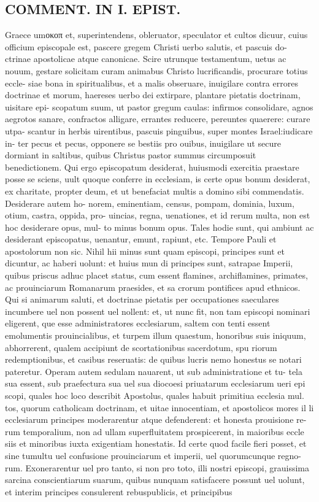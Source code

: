 \documentclass{article}
\begin{document}
\begin{pages}
\section*{COMMENT. IN I. EPIST. }
\marginpar{[ p.490 ]}\pstart Graece umοκοπ et, superintendens, obleruator, speculator et cultos dicuur, cuius officium episcopale est, pascere gregem Christi uerbo salutis, et pascuis do- ctrinae apostolicae atque canonicae. Scire utrunque testamentum, uetus ac nouum, gestare solicitam curam animabus Christo lucrificandis, procurare totius eccle- siae bona in spiritualibus, et a malis obseruare, inuigilare contra errores doctrinae et morum, haereses uerbo dei extirpare, plantare pietatis doctrinam, uisitare epi- scopatum suum, ut pastor gregum caulas: infirmos consolidare, agnos aegrotos sanare, confractos alligare, errantes reducere, pereuntes quaerere: curare utpa- scantur in herbis uirentibus, pascuis pinguibus, super montes Israel:iudicare in- ter pecus et pecus, opponere se bestiis pro ouibus, inuigilare ut secure dormiant in saltibus, quibus Christus pastor summus circumposuit benedictionem. Qui ergo episcopatum desiderat, huiusmodi exercitia praestare posse se sciens, uult quoque conferre in ecclesiam, is certe opus bonum desiderat, ex charitate, propter deum, et ut benefaciat multis a domino sibi commendatis. Desiderare autem ho- norem, eminentiam, census, pompam, dominia, luxum, otium, castra, oppida, pro- uincias, regna, uenationes, et id rerum multa, non est hoc desiderare opus, mul- to minus bonum opus. Tales hodie sunt, qui ambiunt ac desiderant episcopatus, uenantur, emunt, rapiunt, etc. Tempore Pauli et apostolorum non sic. Nihil hii minus sunt quam episcopi, principes sunt et dicuntur, ac haberi uolunt: et huius mun di principes sunt, satrapae Imperii, quibus priscus adhuc placet status, cum essent flamines, archiflamines, primates, ac prouinciarum Romanarum praesides, et sa crorum pontifices apud ethnicos. Qui si animarum saluti, et doctrinae pietatis per occupationes saeculares incumbere uel non possent uel nollent: et, ut nunc fit, non tam episcopi nominari eligerent, que esse administratores ecclesiarum, saltem con tenti essent emolumentis prouincialibus, et turpem illum quaestum, honoribus suis iniquum, abhorrerent, qualem accipiunt de scortationibus sacerdotum, spu riorum redemptionibus, et casibus reseruatis: de quibus lucris nemo honestus se notari pateretur. Operam autem sedulam nauarent, ut sub administratione et tu- tela sua essent, sub praefectura sua uel sua diocoesi priuatarum ecclesiarum ueri epi scopi, quales hoc loco describit Apostolus, quales habuit primitiua ecclesia mul. tos, quorum catholicam doctrinam, et uitae innocentiam, et apostolicos mores il li ecclesiarum principes moderarentur atque defenderent: et honesta prouisione re- rum temporalium, non ad ullam superfluitatem prospicerent, in maioribus eccle siis et minoribus iuxta exigentiam honestatis. Id certe quod facile fieri posset, et sine tumultu uel confusione prouinciarum et imperii, uel quorumcunque regno- rum. Exonerarentur uel pro tanto, si non pro toto, illi nostri episcopi, grauissima sarcina conscientiarum suarum, quibus nunquam satisfacere possunt uel uolunt, et interim principes consulerent rebuspublicis, et principibus 
\end{pages}
\end{document}
